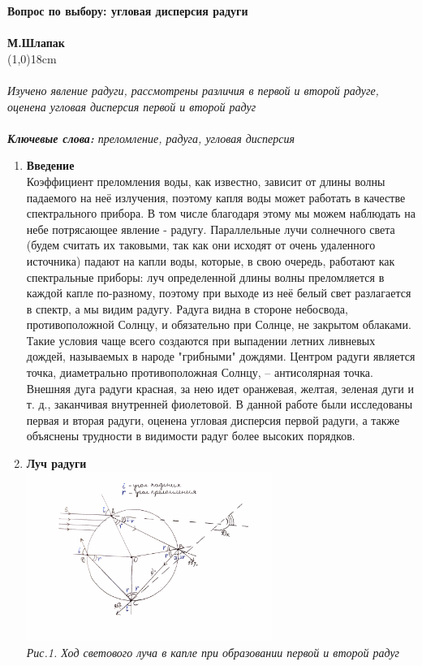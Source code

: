 \documentclass[a4paper]{article}
\begin{document}
 
\large
\noindent \textbf{Вопрос по выбору: угловая дисперсия радуги}\\
\\
\normalsize
\textbf{М.Шлапак}\\
\line(1,0){18cm}\\
\\
\footnotesize
\textit{Изучено явление радуги, рассмотрены различия в первой и второй радуге, оценена угловая дисперсия первой и второй радуг}\\
\\
\textit{\textbf{Ключевые слова:} преломление, радуга, угловая дисперсия}\\

\begin{multicols}{2}
\begin{enumerate}
\small
\item \textbf{Введение}\\
Коэффициент преломления воды, как известно, зависит от длины волны падаемого на неё излучения, поэтому капля воды может работать в качестве спектрального прибора. В том числе благодаря этому мы можем наблюдать на небе потрясающее явление - радугу. Параллельные лучи солнечного света (будем считать их таковыми, так как они исходят от очень удаленного источника) падают на капли воды, которые, в свою очередь, работают как спектральные приборы: луч определенной длины волны преломляется в каждой капле по-разному, поэтому при выходе из неё белый свет разлагается в спектр, а мы видим радугу. Радуга видна в стороне небосвода, противоположной Солнцу, и обязательно при Солнце, не закрытом облаками. Такие условия чаще всего создаются при выпадении летних ливневых дождей, называемых в народе "грибными" дождями. Центром радуги является точка, диаметрально противоположная Солнцу, – антисолярная точка. Внешняя дуга радуги красная, за нею идет оранжевая, желтая, зеленая дуги и т. д., заканчивая внутренней фиолетовой. В данной работе были исследованы первая и вторая радуги, оценена угловая дисперсия первой радуги, а также объяснены трудности в видимости радуг более высоких порядков.
\item \textbf{Луч радуги}\\ 
\includegraphics[width=8cm]{g1}\\
\textit{Рис.1. Ход светового луча в капле при образовании первой и второй радуг}\\


\end{enumerate}
\end{multicols}
\end{document}
